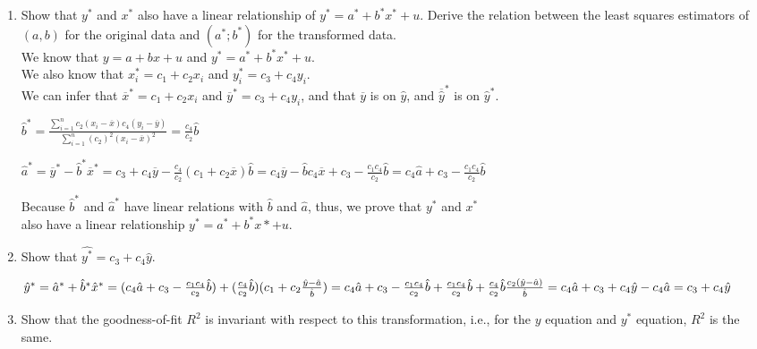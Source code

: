 \documentclass[12pt]{article}%
\begin{document}
\pagebreak
\begin{enumerate}
    \item \color{black} Show that $y^*$ and $x^*$ also have a linear relationship of $y^* = a^* + b^* x^* + u$. Derive the relation between the least squares estimators of $(a, b)$ for the original data and $(a^*; b^*)$ for the transformed data.\\
    \color{blue}
    We know that $y = a + bx + u$ and $y^* = a^* + b^* x^* + u$. \\
    We also know that $x_i^* = c_1 + c_2x_i$ and $y_i^* = c_3 + c_4y_i$. \\
    We can infer that $\overline{x}^* = c_1 + c_2x_i$ and $\overline{y}^* = c_3 + c_4y_i$,
    and that $\overline{y}$ is on $\hat{y}$, and $\overline{\hat{y}}^*$ is on $\hat{y}^*$.
    
    $\hat{b}^* = \frac{\sum_{i=1}^{n}c_2(x_i-\overline{x})c_4(y_i-\overline{y})}{\sum_{i=1}^{n}(c_2)^2(x_i-\overline{x})^2} = \frac{c_4}{c_2}\hat{b}$
    
    $\hat{a}^* = \overline{y}^* - \hat{b}^*\overline{x}^* = c_3+c_4\overline{y} - \frac{c_4}{c_2}(c_1+c_2\overline{x})\hat{b} = c_4\overline{y}-\hat{b}c_4\overline{x}+c_3-\frac{c_1 c_4}{c_2}\hat{b} = c_4\hat{a}+c_3-\frac{c_1 c_4}{c_2}\hat{b}$
    
    Because $\hat{b}^*$ and $\hat{a}^*$ have linear relations with $\hat{b}$ and $\hat{a}$, thus, we prove that $y^*$ and $x^*$ \\ also have a linear relationship $y^* = a^* + b^* x* + u$. 

    \item \color{black}Show that $\hat{y^*} = c_3 + c_4 \hat{y}$.
    \color{blue}
    
    $\hat{y}^* = \hat{a}^* + \hat{b}^* \hat{x}^* \\
    = (c_4 \hat{a}+c_3-\frac{c_1 c_4}{c_2}\hat{b})+(\frac{c_4}{c_2}\hat{b})(c_1+c_2\frac{\hat{y}-\hat{a}}{\hat{b}}) \\
    = c_4 \hat{a}+c_3-\frac{c_1 c_4}{c_2}\hat{b}+\frac{c_1 c_4}{c_2}\hat{b}+\frac{c_4}{c_2}\hat{b}\frac{c_2(\hat{y}-\hat{a})}{\hat{b}}\\
    = c_4\hat{a}+c_3+c_4\hat{y}-c_4\hat{a}\\
    = c_3+c_4\hat{y}$
    
    \item \color{black}Show that the goodness-of-fit $R^2$ is invariant with respect to this transformation, i.e., for the $y$ equation and $y^*$ equation, $R^2$ is the same.
    \color{blue}
    

\end{enumerate}
\end{document}
